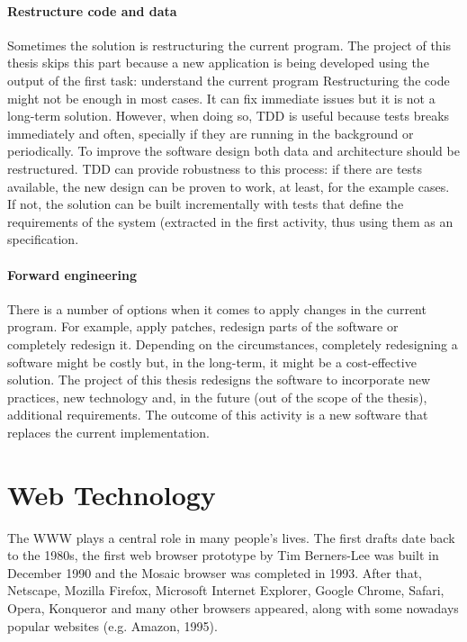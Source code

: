 \paragraph{Restructure code and data}
Sometimes the solution is restructuring the current program.
The project of this thesis skips this part because a new application is being developed using the output of the first task: understand the current program
Restructuring the code might not be enough in most cases. 
It can fix immediate issues but it is not a long-term solution.
However, when doing so, \ac{TDD} is useful because tests breaks immediately and often, specially if they are running in the background or periodically.
To improve the software design both data and architecture should be restructured.
\ac{TDD} can provide robustness to this process: if there are tests available, the new design can be proven to work, at least, for the example cases. 
If not, the solution can be built incrementally with tests that define the requirements of the system (extracted in the first activity, thus using them as an specification.

\paragraph{Forward engineering}
There is a number of options when it comes to apply changes in the current program. 
For example, apply patches, redesign parts of the software or completely redesign it.
Depending on the circumstances, completely redesigning a software might be costly but, in the long-term, it might be a cost-effective solution.
The project of this thesis redesigns the software to incorporate new practices, new technology and, in the future (out of the scope of the thesis), additional requirements.
The outcome of this activity is a new software that replaces the current implementation.


\section{Web Technology}
The \ac{WWW} plays a central role in many people's lives.
The first drafts date back to the 1980s, the first web browser prototype by Tim Berners-Lee was built in December 1990 and the Mosaic browser was completed in 1993.
After that, Netscape, Mozilla Firefox, Microsoft Internet Explorer, Google Chrome, Safari, Opera, Konqueror and many other browsers appeared, along with some nowadays popular websites (e.g. Amazon, 1995).

